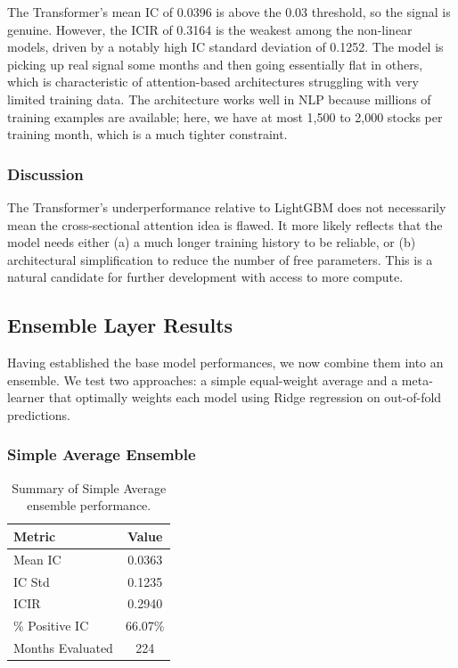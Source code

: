 \documentclass[11pt]{article}
\begin{document}
The Transformer's mean IC of 0.0396 is above the 0.03 threshold, so the signal is genuine. However, the ICIR of 0.3164 is the weakest among the non-linear models, driven by a notably high IC standard deviation of 0.1252. The model is picking up real signal some months and then going essentially flat in others, which is characteristic of attention-based architectures struggling with very limited training data. The architecture works well in NLP because millions of training examples are available; here, we have at most 1,500 to 2,000 stocks per training month, which is a much tighter constraint.

\subsubsection{Discussion}

The Transformer's underperformance relative to LightGBM does not necessarily mean the cross-sectional attention idea is flawed. It more likely reflects that the model needs either (a) a much longer training history to be reliable, or (b) architectural simplification to reduce the number of free parameters. This is a natural candidate for further development with access to more compute.

\subsection{Ensemble Layer Results}

Having established the base model performances, we now combine them into an ensemble. We test two approaches: a simple equal-weight average and a meta-learner that optimally weights each model using Ridge regression on out-of-fold predictions.

\subsubsection{Simple Average Ensemble}

\begin{table}[H]
\centering
\begin{tabular}{lc}
\toprule
\textbf{Metric} & \textbf{Value} \\
\midrule
Mean IC & 0.0363 \\
IC Std & 0.1235 \\
ICIR & 0.2940 \\
\% Positive IC & 66.07\% \\
Months Evaluated & 224 \\
\bottomrule
\end{tabular}
\caption{Summary of Simple Average ensemble performance.}
\label{tab:simple_avg_results}
\end{table}
\end{document}

